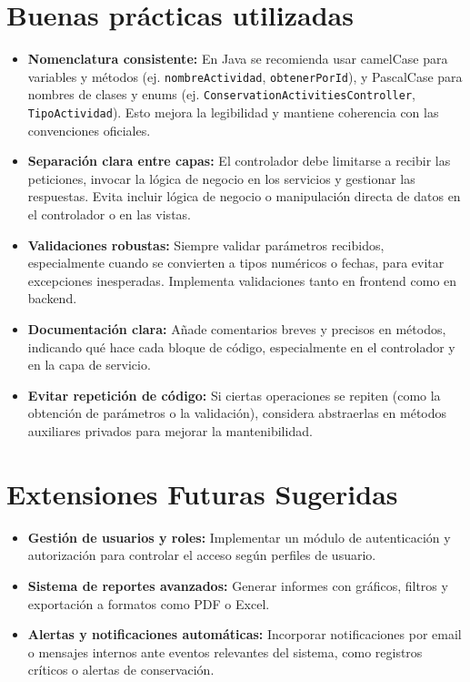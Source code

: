 \section{Buenas prácticas utilizadas}
\begin{itemize}
    \item \textbf{Nomenclatura consistente:} En Java se recomienda usar camelCase para variables y métodos (ej. \texttt{nombreActividad}, \texttt{obtenerPorId}), y PascalCase para nombres de clases y enums (ej. \texttt{ConservationActivitiesController}, \texttt{TipoActividad}). Esto mejora la legibilidad y mantiene coherencia con las convenciones oficiales.
    \item \textbf{Separación clara entre capas:} El controlador debe limitarse a recibir las peticiones, invocar la lógica de negocio en los servicios y gestionar las respuestas. Evita incluir lógica de negocio o manipulación directa de datos en el controlador o en las vistas.
    \item \textbf{Validaciones robustas:} Siempre validar parámetros recibidos, especialmente cuando se convierten a tipos numéricos o fechas, para evitar excepciones inesperadas. Implementa validaciones tanto en frontend como en backend.
    \item \textbf{Documentación clara:} Añade comentarios breves y precisos en métodos, indicando qué hace cada bloque de código, especialmente en el controlador y en la capa de servicio.
    \item \textbf{Evitar repetición de código:} Si ciertas operaciones se repiten (como la obtención de parámetros o la validación), considera abstraerlas en métodos auxiliares privados para mejorar la mantenibilidad.
\end{itemize}

\section{Extensiones Futuras Sugeridas}
\begin{itemize}
    \item \textbf{Gestión de usuarios y roles:} Implementar un módulo de autenticación y autorización para controlar el acceso según perfiles de usuario.
    \item \textbf{Sistema de reportes avanzados:} Generar informes con gráficos, filtros y exportación a formatos como PDF o Excel.
    \item \textbf{Alertas y notificaciones automáticas:} Incorporar notificaciones por email o mensajes internos ante eventos relevantes del sistema, como registros críticos o alertas de conservación.
\end{itemize}
